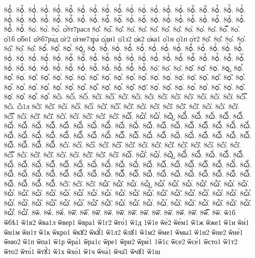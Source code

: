 {8ѻ҅ⷣ.
8ѻ҅ⷤ.
8ѻ҅ⷥ.
8ѻ҅ⷦ.
8ѻ҅ⷧ.
8ѻ҅ⷨ.
8ѻ҅ⷩ.
8ѻ҅ⷪ.
8ѻ҅ⷫ.
8ѻ҅ⷬ.
8ѻ҅ⷭ.
8ѻ҅ⷮ.
8ѻ҅ⷯ.
8ѻ҅ⷰ.
8ѻ҅ⷱ.
8ѻ҅ⷲ.
8ѻ҅ⷳ.
8ѻ҅ⷴ.
8ѻ҅ⷵ.
8ѻ҅ⷶ.
8ѻ҅ⷷ.
8ѻ҅ⷸ.
8ѻ҅ⷹ.
8ѻ҅ⷺ.
8ѻ҅ⷻ.
8ѻ҅ⷼ.
8ѻ҅ⷽ.
8ѻ҅ⷾ.
8ѻ҅ⷿ.
8ѻ҅꙯.
8ѻ҅ꙴ.
8ѻ҅ꙵ.
8ѻ҅ꙶ.
8ѻ҅ꙷ.
8ѻ҅ꙸ.
8ѻ҅ꙹ.
8ѻ҅ꙺ.
8ѻ҅ꙻ.
8ѻ҅꙼.
8ѻ҅꙽.
8ѻ҅ꚞ.
8ѻ҅ꚟ.
8ѻ҆.
8ѻ҆̀.
8ѻ҆́.
ѻ҆́8т7расл
8ѻ҆̂.
8ѻ҆̅.
8ѻ҆̆.
8ѻ҆̇.
8ѻ҆̈.
8ѻ҆̋.
8ѻ҆̏.
8ѻ҆̑.
8ѻ҆̓.
8ѻ҆̔.
8ѻ҆̾.
8ѻ҆̿.
8ѻ҆͘.
ѻ҆1б
ѻ҆бо1
ѻ҆8б7ра́д
ѻ҆г2
ѻ҆гне7зра́
ѻ҆ди1
ѻ҆1з2
ѻ҆к2
ѻ҆ка1
ѻ҆1н
ѻ҆1п
ѻ҆т2
8ѻ҆҃.
8ѻ҆҄.
8ѻ҆҅.
8ѻ҆҆.
8ѻ҆҇.
8ѻ҆᷀.
8ѻ҆᷁.
8ѻ҆᷶.
8ѻ᷷҆.
8ѻ᷸҆.
8ѻ᷹҆.
8ѻ҆ⷠ.
8ѻ҆ⷡ.
8ѻ҆ⷢ.
8ѻ҆ⷣ.
8ѻ҆ⷤ.
8ѻ҆ⷥ.
8ѻ҆ⷦ.
8ѻ҆ⷧ.
8ѻ҆ⷨ.
8ѻ҆ⷩ.
8ѻ҆ⷪ.
8ѻ҆ⷫ.
8ѻ҆ⷬ.
8ѻ҆ⷭ.
8ѻ҆ⷮ.
8ѻ҆ⷯ.
8ѻ҆ⷰ.
8ѻ҆ⷱ.
8ѻ҆ⷲ.
8ѻ҆ⷳ.
8ѻ҆ⷴ.
8ѻ҆ⷵ.
8ѻ҆ⷶ.
8ѻ҆ⷷ.
8ѻ҆ⷸ.
8ѻ҆ⷹ.
8ѻ҆ⷺ.
8ѻ҆ⷻ.
8ѻ҆ⷼ.
8ѻ҆ⷽ.
8ѻ҆ⷾ.
8ѻ҆ⷿ.
8ѻ҆꙯.
8ѻ҆ꙴ.
8ѻ҆ꙵ.
8ѻ҆ꙶ.
8ѻ҆ꙷ.
8ѻ҆ꙸ.
8ѻ҆ꙹ.
8ѻ҆ꙺ.
8ѻ҆ꙻ.
8ѻ҆꙼.
8ѻ҆꙽.
8ѻ҆ꚞ.
8ѻ҆ꚟ.
8ѻ҇.
8ѻ᷀.
8ѻ᷁.
8ѻ᷶.
8ѻ᷷.
8ѻ᷸.
8ѻ᷹.
8ѻⷠ.
8ѻⷡ.
8ѻⷢ.
8ѻⷣ.
8ѻⷤ.
8ѻⷥ.
8ѻⷦ.
8ѻⷧ.
8ѻⷨ.
8ѻⷩ.
8ѻⷪ.
8ѻⷫ.
8ѻⷬ.
8ѻⷭ.
8ѻⷮ.
8ѻⷯ.
8ѻⷰ.
8ѻⷱ.
8ѻⷲ.
8ѻⷳ.
8ѻⷴ.
8ѻⷵ.
8ѻⷶ.
8ѻⷷ.
8ѻⷸ.
8ѻⷹ.
8ѻⷺ.
8ѻⷻ.
8ѻⷼ.
8ѻⷽ.
8ѻⷾ.
8ѻⷿ.
8ѻ꙯.
8ѻꙴ.
8ѻꙵ.
8ѻꙶ.
8ѻꙷ.
8ѻꙸ.
8ѻꙹ.
8ѻꙺ.
8ѻꙻ.
8ѻ꙼.
8ѻ꙽.
8ѻꚞ.
8ѻꚟ.
8ѽ.
8ѽ̀.
8ѽ́.
8ѽ̂.
8ѽ̅.
8ѽ̆.
8ѽ̇.
8ѽ̈.
8ѽ̋.
8ѽ̏.
8ѽ̑.
8ѽ̓.
8ѽ̔.
8ѽ̾.
8ѽ̿.
8ѽ͘.
ѽ1л
8ѽ҃.
8ѽ҄.
8ѽ҅.
8ѽ҅̀.
8ѽ҅́.
8ѽ҅̂.
8ѽ҅̅.
8ѽ҅̆.
8ѽ҅̇.
8ѽ҅̈.
8ѽ҅̋.
8ѽ҅̏.
8ѽ҅̑.
8ѽ҅̓.
8ѽ҅̔.
8ѽ҅̾.
8ѽ҅̿.
8ѽ҅͘.
8ѽ҅҃.
8ѽ҅҄.
8ѽ҅҅.
8ѽ҅҆.
8ѽ҅҇.
8ѽ҅᷀.
8ѽ҅᷁.
8ѽ҅᷶.
8ѽ᷷҅.
8ѽ᷸҅.
8ѽ᷹҅.
8ѽ҅ⷠ.
8ѽ҅ⷡ.
8ѽ҅ⷢ.
8ѽ҅ⷣ.
8ѽ҅ⷤ.
8ѽ҅ⷥ.
8ѽ҅ⷦ.
8ѽ҅ⷧ.
8ѽ҅ⷨ.
8ѽ҅ⷩ.
8ѽ҅ⷪ.
8ѽ҅ⷫ.
8ѽ҅ⷬ.
8ѽ҅ⷭ.
8ѽ҅ⷮ.
8ѽ҅ⷯ.
8ѽ҅ⷰ.
8ѽ҅ⷱ.
8ѽ҅ⷲ.
8ѽ҅ⷳ.
8ѽ҅ⷴ.
8ѽ҅ⷵ.
8ѽ҅ⷶ.
8ѽ҅ⷷ.
8ѽ҅ⷸ.
8ѽ҅ⷹ.
8ѽ҅ⷺ.
8ѽ҅ⷻ.
8ѽ҅ⷼ.
8ѽ҅ⷽ.
8ѽ҅ⷾ.
8ѽ҅ⷿ.
8ѽ҅꙯.
8ѽ҅ꙴ.
8ѽ҅ꙵ.
8ѽ҅ꙶ.
8ѽ҅ꙷ.
8ѽ҅ꙸ.
8ѽ҅ꙹ.
8ѽ҅ꙺ.
8ѽ҅ꙻ.
8ѽ҅꙼.
8ѽ҅꙽.
8ѽ҅ꚞ.
8ѽ҅ꚟ.
8ѽ҆.
8ѽ҆̀.
8ѽ҆́.
8ѽ҆̂.
8ѽ҆̅.
8ѽ҆̆.
8ѽ҆̇.
8ѽ҆̈.
8ѽ҆̋.
8ѽ҆̏.
8ѽ҆̑.
8ѽ҆̓.
8ѽ҆̔.
8ѽ҆̾.
8ѽ҆̿.
8ѽ҆͘.
8ѽ҆҃.
8ѽ҆҄.
8ѽ҆҅.
8ѽ҆҆.
8ѽ҆҇.
8ѽ҆᷀.
8ѽ҆᷁.
8ѽ҆᷶.
8ѽ᷷҆.
8ѽ᷸҆.
8ѽ᷹҆.
8ѽ҆ⷠ.
8ѽ҆ⷡ.
8ѽ҆ⷢ.
8ѽ҆ⷣ.
8ѽ҆ⷤ.
8ѽ҆ⷥ.
8ѽ҆ⷦ.
8ѽ҆ⷧ.
8ѽ҆ⷨ.
8ѽ҆ⷩ.
8ѽ҆ⷪ.
8ѽ҆ⷫ.
8ѽ҆ⷬ.
8ѽ҆ⷭ.
8ѽ҆ⷮ.
8ѽ҆ⷯ.
8ѽ҆ⷰ.
8ѽ҆ⷱ.
8ѽ҆ⷲ.
8ѽ҆ⷳ.
8ѽ҆ⷴ.
8ѽ҆ⷵ.
8ѽ҆ⷶ.
8ѽ҆ⷷ.
8ѽ҆ⷸ.
8ѽ҆ⷹ.
8ѽ҆ⷺ.
8ѽ҆ⷻ.
8ѽ҆ⷼ.
8ѽ҆ⷽ.
8ѽ҆ⷾ.
8ѽ҆ⷿ.
8ѽ҆꙯.
8ѽ҆ꙴ.
8ѽ҆ꙵ.
8ѽ҆ꙶ.
8ѽ҆ꙷ.
8ѽ҆ꙸ.
8ѽ҆ꙹ.
8ѽ҆ꙺ.
8ѽ҆ꙻ.
8ѽ҆꙼.
8ѽ҆꙽.
8ѽ҆ꚞ.
8ѽ҆ꚟ.
8ѽ҇.
8ѽ᷀.
8ѽ᷁.
8ѽ᷶.
8ѽ᷷.
8ѽ᷸.
8ѽ᷹.
8ѽⷠ.
8ѽⷡ.
8ѽⷢ.
8ѽⷣ.
8ѽⷤ.
8ѽⷥ.
8ѽⷦ.
8ѽⷧ.
8ѽⷨ.
8ѽⷩ.
8ѽⷪ.
8ѽⷫ.
8ѽⷬ.
8ѽⷭ.
8ѽⷮ.
8ѽⷯ.
8ѽⷰ.
8ѽⷱ.
8ѽⷲ.
8ѽⷳ.
8ѽⷴ.
8ѽⷵ.
8ѽⷶ.
8ѽⷷ.
8ѽⷸ.
8ѽⷹ.
8ѽⷺ.
8ѽⷻ.
8ѽⷼ.
8ѽⷽ.
8ѽⷾ.
8ѽⷿ.
8ѽ꙯.
8ѽꙴ.
8ѽꙵ.
8ѽꙶ.
8ѽꙷ.
8ѽꙸ.
8ѽꙹ.
8ѽꙺ.
8ѽꙻ.
8ѽ꙼.
8ѽ꙽.
8ѽꚞ.
8ѽꚟ.
8ѿ.
8ѿ̀.
8ѿ́.
8ѿ̂.
8ѿ̅.
8ѿ̆.
8ѿ̇.
8ѿ̈.
8ѿ̋.
8ѿ̏.
8ѿ̑.
8ѿ̓.
8ѿ̔.
8ѿ̾.
8ѿ̿.
8ѿ͘.
ѿ1б
ѿбѣ1
ѿ1в2
ѿва1л
ѿвер1
ѿвра1
ѿ1г2
ѿго́1
ѿ1д
1ѿ1е
ѿе́2
ѿе́м1
ѿ1ж
ѿже1
ѿ1и
ѿи́1
ѿи1м
ѿи1т
ѿ1к
ѿкро1
ѿкꙋ2
ѿкꙋ́1
ѿ1л2
ѿлꙋ1
ѿ1м2
ѿме1
ѿмы1
ѿ1н2
ѿне2
ѿне́1
ѿню2
ѿ1п
ѿпа1
ѿ1р
ѿра́1
ѿра1с
ѿре1
ѿри2
ѿри́1
1ѿ1с
ѿсе2
ѿсе́1
ѿсто1
ѿ1т2
ѿто2
ѿто́1
ѿтꙋ́1
ѿ1х
ѿхо́1
ѿ1ч
ѿча́1
ѿча̑1
ѿчꙋ1
ѿ1ш
}
